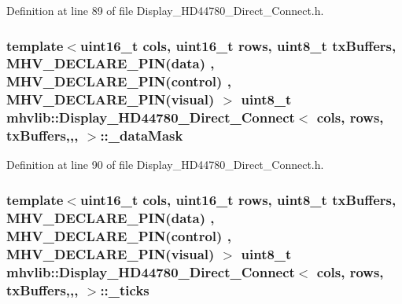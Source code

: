 Definition at line 89 of file Display\-\_\-\-H\-D44780\-\_\-\-Direct\-\_\-\-Connect.\-h.

\hypertarget{classmhvlib_1_1_display___h_d44780___direct___connect_ab0dffb5c1b886f64232746c8b79b5970}{
\subsubsection[{\-\_\-data\-Mask}]{\setlength{\rightskip}{0pt plus 5cm}template$<$uint16\-\_\-t cols, uint16\-\_\-t rows, uint8\-\_\-t tx\-Buffers, M\-H\-V\-\_\-\-D\-E\-C\-L\-A\-R\-E\-\_\-\-P\-I\-N(data) , M\-H\-V\-\_\-\-D\-E\-C\-L\-A\-R\-E\-\_\-\-P\-I\-N(control) , M\-H\-V\-\_\-\-D\-E\-C\-L\-A\-R\-E\-\_\-\-P\-I\-N(visual) $>$ uint8\-\_\-t {\bf mhvlib\-::\-Display\-\_\-\-H\-D44780\-\_\-\-Direct\-\_\-\-Connect}$<$ cols, rows, tx\-Buffers,,, $>$\-::\-\_\-data\-Mask\hspace{0.3cm}{\ttfamily [protected]}}}\label{classmhvlib_1_1_display___h_d44780___direct___connect_ab0dffb5c1b886f64232746c8b79b5970}


Definition at line 90 of file Display\-\_\-\-H\-D44780\-\_\-\-Direct\-\_\-\-Connect.\-h.

\hypertarget{classmhvlib_1_1_display___h_d44780___direct___connect_a0ce9e9fada2886430619900c3a130049}{
\subsubsection[{\-\_\-ticks}]{\setlength{\rightskip}{0pt plus 5cm}template$<$uint16\-\_\-t cols, uint16\-\_\-t rows, uint8\-\_\-t tx\-Buffers, M\-H\-V\-\_\-\-D\-E\-C\-L\-A\-R\-E\-\_\-\-P\-I\-N(data) , M\-H\-V\-\_\-\-D\-E\-C\-L\-A\-R\-E\-\_\-\-P\-I\-N(control) , M\-H\-V\-\_\-\-D\-E\-C\-L\-A\-R\-E\-\_\-\-P\-I\-N(visual) $>$ uint8\-\_\-t {\bf mhvlib\-::\-Display\-\_\-\-H\-D44780\-\_\-\-Direct\-\_\-\-Connect}$<$ cols, rows, tx\-Buffers,,, $>$\-::\-\_\-ticks\hspace{0.3cm}{\ttfamily [protected]}}}\label{classmhvlib_1_1_display___h_d44780___direct___connect_a0ce9e9fada2886430619900c3a130049}


